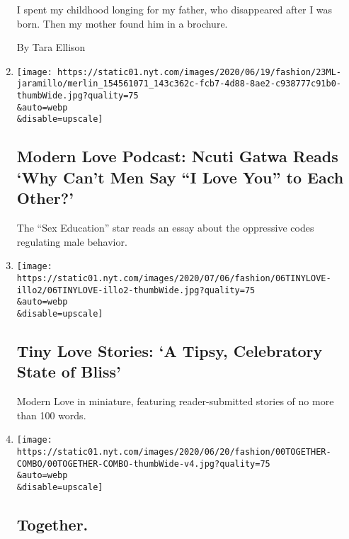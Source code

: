 \begin{enumerate}
  I spent my childhood longing for my father, who disappeared after I
  was born. Then my mother found him in a brochure.

  By Tara Ellison
\item
  \href{/2020/06/17/style/modern-love-podcast-ncuti-gatwa.html}{}

  \texttt{[image: https://static01.nyt.com/images/2020/06/19/fashion/23ML-jaramillo/merlin\_154561071\_143c362c-fcb7-4d88-8ae2-c938777c91b0-thumbWide.jpg?quality=75\\\&auto=webp\\\&disable=upscale]}

  \hypertarget{modern-love-podcast-ncuti-gatwa-reads-why-cant-men-say-i-love-you-to-each-other}{%
  \subsection{Modern Love Podcast: Ncuti Gatwa Reads `Why Can't Men Say
  ``I Love You'' to Each
  Other?'}\label{modern-love-podcast-ncuti-gatwa-reads-why-cant-men-say-i-love-you-to-each-other}}

  The ``Sex Education'' star reads an essay about the oppressive codes
  regulating male behavior.
\item
  \href{/2020/06/16/style/tiny-modern-love-stories-coronavirus-a-tipsy-celebratory-state-of-bliss.html}{}

  \texttt{[image: https://static01.nyt.com/images/2020/07/06/fashion/06TINYLOVE-illo2/06TINYLOVE-illo2-thumbWide.jpg?quality=75\\\&auto=webp\\\&disable=upscale]}

  \hypertarget{tiny-love-stories-a-tipsy-celebratory-state-of-bliss}{%
  \subsection{Tiny Love Stories: `A Tipsy, Celebratory State of
  Bliss'}\label{tiny-love-stories-a-tipsy-celebratory-state-of-bliss}}

  Modern Love in miniature, featuring reader-submitted stories of no
  more than 100 words.
\item
  \href{/2020/06/12/style/modern-love-coronavirus-living-together.html}{}

  \texttt{[image: https://static01.nyt.com/images/2020/06/20/fashion/00TOGETHER-COMBO/00TOGETHER-COMBO-thumbWide-v4.jpg?quality=75\\\&auto=webp\\\&disable=upscale]}

  \hypertarget{together}{%
  \subsection{Together.}\label{together}}


\end{enumerate}
